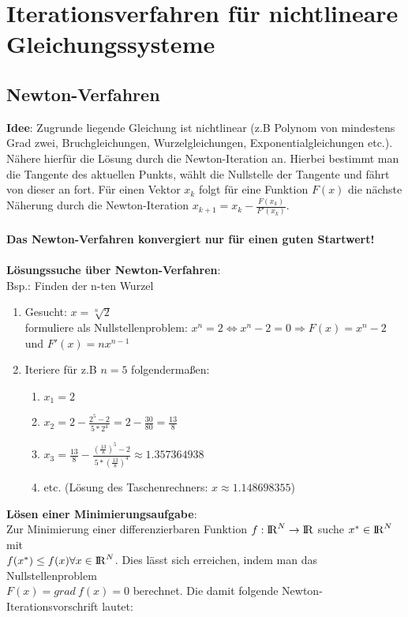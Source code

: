 \documentclass[10pt,a4paper]{article}
\def\realnumbers{{\rm I\!R}}
\begin{document}
	\section{Iterationsverfahren für nichtlineare Gleichungssysteme}
	\subsection{Newton-Verfahren}
	\textbf{Idee}: Zugrunde liegende Gleichung ist nichtlinear (z.B Polynom von mindestens Grad zwei, Bruchgleichungen, Wurzelgleichungen, Exponentialgleichungen etc.). Nähere hierfür die Lösung durch die Newton-Iteration an. Hierbei bestimmt man die Tangente des aktuellen Punkts, wählt die Nullstelle der Tangente und fährt von dieser an fort. Für einen Vektor $x_k$ folgt für eine Funktion $F(x)$ die nächste Näherung durch die Newton-Iteration $x_{k + 1} = x_k - \frac{F(x_k)}{F'(x_k)}$.\\\\
	\textbf{Das Newton-Verfahren konvergiert nur für einen guten Startwert!}\\\\
	\textbf{Lösungssuche über Newton-Verfahren}:\\
	Bsp.: Finden der n-ten Wurzel
	\begin{enumerate}
		\item Gesucht: $x = \sqrt[n]{2}$\\formuliere als Nullstellenproblem: $x^n = 2 \Leftrightarrow x^n - 2 = 0 \Rightarrow F(x) = x^n - 2$ und $F'(x) = nx^{n - 1}$
		\item Iteriere für z.B $n = 5$ folgendermaßen:
		\begin{enumerate}
			\item $x_1 = 2$
			\item $x_2 = 2 - \frac{2^5 - 2}{5 * 2^4} = 2 - \frac{30}{80} = \frac{13}{8}$
			\item $x_3 = \frac{13}{8} - \frac{(\frac{13}{8})^5 - 2}{5 * (\frac{13}{8})^4} \approx 1.357364938$
			\item etc. (Lösung des Taschenrechners: $x \approx 1.148698355$)
		\end{enumerate}
	\end{enumerate}
	\textbf{Lösen einer Minimierungsaufgabe}:                                                                                        \\
	Zur Minimierung einer differenzierbaren Funktion $f: \realnumbers^N \rightarrow \realnumbers$ suche $x^* \in \realnumbers^N$ mit \\$f(x^*) \leq f(x) \forall x \in \realnumbers^N$. Dies lässt sich erreichen, indem man das Nullstellenproblem\\$F(x) = grad\ f(x) = 0$ berechnet. Die damit folgende Newton-Iterationsvorschrift lautet:
\end{document}
